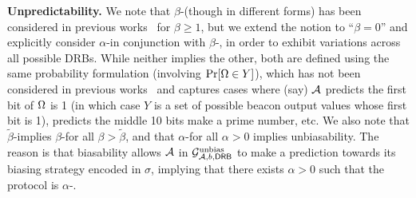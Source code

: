 \noindent\textbf{Unpredictability.}
We note that $\beta$-\interunpredictability (though in different forms) has been considered in previous works~\cite{bhat2020randpiper,bhat2022optrand} for $\beta \geq 1$, but we extend the notion to ``$\beta = 0$'' and explicitly consider $\alpha$-\intraunpredictability in conjunction with $\beta$-\interunpredictability, in order to exhibit variations across all possible DRBs.
While neither implies the other, both are defined using the same probability formulation (involving $\Pr[\Omega \in Y]$), which has not been considered in previous works~\cite{bhat2020randpiper,das2021spurt,schindler2020hydrand} and captures cases where (say) $\mathcal{A}$ predicts the first bit of $\Omega$ is 1 (in which case $Y$ is a set of possible beacon output values whose first bit is 1), predicts the middle 10 bits make a prime number, etc.
We also note that $\tilde{\beta}$-\interunpredictability implies $\beta$-\interunpredictability for all $\beta > \tilde{\beta}$, and that $\alpha$-\intraunpredictability for all $\alpha > 0$ implies unbiasability.
The reason is that biasability allows $\mathcal{A}$ in $\mathcal{G}^\text{unbias}_{\mathcal{A}, b, \mathsf{DRB}}$ to make a prediction towards its biasing strategy encoded in $\sigma$, implying that there exists $\alpha > 0$ such that the protocol is $\alpha$-\intrapredictable.


